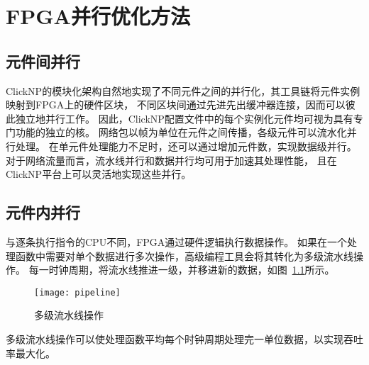 \chapter{FPGA并行优化方法}
\section{元件间并行}
ClickNP的模块化架构自然地实现了不同元件之间的并行化，其工具链将元件实例映射到FPGA上的硬件区块，
不同区块间通过先进先出缓冲器连接，因而可以彼此独立地并行工作。
因此，ClickNP配置文件中的每个实例化元件均可视为具有专门功能的独立的核。
网络包以帧为单位在元件之间传播，各级元件可以流水化并行处理。
在单元件处理能力不足时，还可以通过增加元件数，实现数据级并行。
对于网络流量而言，流水线并行和数据并行均可用于加速其处理性能，
且在ClickNP平台上可以灵活地实现这些并行。

\section{元件内并行}
与逐条执行指令的CPU不同，FPGA通过硬件逻辑执行数据操作。
如果在一个处理函数中需要对单个数据进行多次操作，高级编程工具会将其转化为多级流水线操作。
每一时钟周期，将流水线推进一级，并移进新的数据，如图~\ref{fig:pipeline}所示。
\begin{figure}[ht]
\centering
\texttt{[image: pipeline]}
\caption{多级流水线操作} \label{fig:pipeline}
\end{figure}

多级流水线操作可以使处理函数平均每个时钟周期处理完一单位数据，以实现吞吐率最大化。
